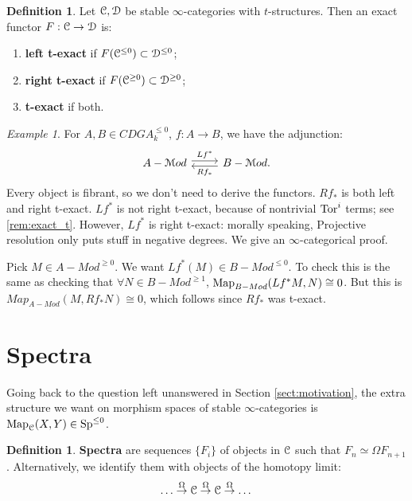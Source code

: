\documentclass[10pt,a4paper,reqno,oneside]{book} %
\theoremstyle{plain}
\theoremstyle{definition}
\newtheorem{defin}[thm]{Definition}
\theoremstyle{remark}
\newtheorem{eg}[thm]{Example}
\numberwithin{equation}{section}
\begin{document}
\begin{defin}
Let $\mathcal C, \mathcal D$ be stable $\infty$-categories with $t$-structures. Then an exact functor $F : \mathcal C \to \mathcal D$ is:
\begin{enumerate}
\item \textbf{left t-exact} if $F(\mathcal C^{\leq 0}) \subset \mathcal D^{\leq 0}$;
\item \textbf{right t-exact} if $F(\mathcal C^{\geq 0}) \subset \mathcal D^{\geq 0}$;
\item \textbf{t-exact} if both.
\end{enumerate}
\end{defin}

\begin{eg}
\label{eg:modules_t_exact}
For $A,B \in CDGA_k^{\leq 0}$, $f:A \to B$, we have the adjunction:
\[
\begin{tikzcd}
A-\cM od\arrow[shift left]{r}{Lf^*} & B-\cM od\arrow[shift left]{l}{Rf_*}.
\end{tikzcd}
\] 
Every object is fibrant, so we don't need to
derive the functors. $Rf_*$ is both left and right t-exact. $Lf^*$ is not right t-exact, because of nontrivial $\mathrm{Tor}^i$
terms; see \ref{rem:exact_t}. However, $Lf^*$ is right t-exact: 
morally speaking, Projective resolution only puts stuff in negative degrees. We give an $\infty$-categorical proof.

Pick $M \in A-Mod^{\geq 0}$. We want $Lf^*(M) \in B-Mod^{\leq 0}$. To check this is the same as checking that
$\forall N \in B-Mod^{\geq 1}$, $\operatorname{Map}_{B-Mod}(Lf^*M,N) \cong 0$. But this is $Map_{A-Mod}(M,Rf_*N) \cong 0$, which
follows since $Rf_*$ was t-exact.
\end{eg}


\section{Spectra}
\label{sect:spectra}

Going back to the question left unanswered in Section \ref{sect:motivation}, the extra structure we want on
morphism spaces of stable $\infty$-categories is $\operatorname{Map}_{\mathcal C}(X,Y) \in \operatorname{Sp}^{\leq 0}$.

\begin{defin}
\textbf{Spectra} are sequences $\{F_i\}$ of objects in $\mathcal C$ such that $F_n \simeq \Omega F_{n+1}$. Alternatively,
we identify them with objects of the homotopy limit:
\[	\dots \overset{\Omega}{\to} \mathcal C \overset{\Omega}{\to} \mathcal C \overset{\Omega}{\to} \dots	\]
\end{defin}
\end{document}
